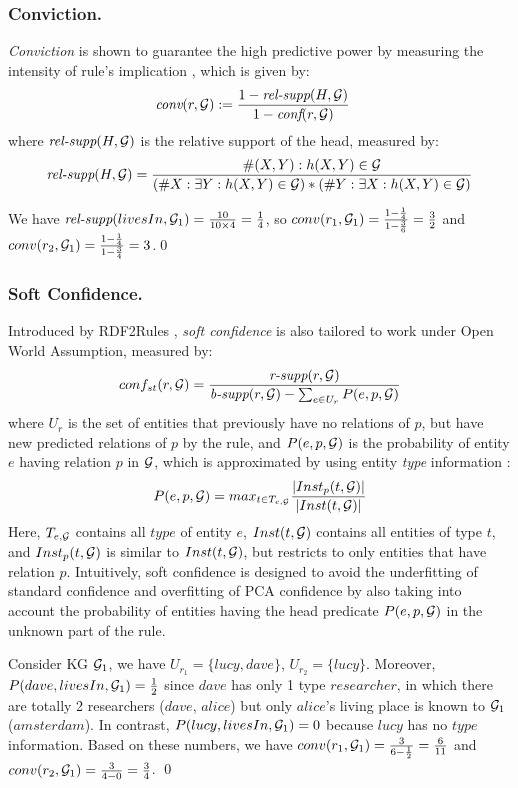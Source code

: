 \subsubsection{Conviction.} \textit{Conviction} is shown to guarantee the high predictive power \cite{Azevedo2007} by measuring the intensity of rule's implication \cite{metrics-summary}, which is given by:
\begin{align*}
\textit{conv}(r,\mathcal{G}) & := \frac{1 - \textit{rel-supp}(H, \mathcal{G})}{1-\textit{conf}(r,\mathcal{G})}
\end{align*}
where $\textit{rel-supp}(H, \mathcal{G})$ is the relative support of the head, measured by:
\begin{align*}
\textit{rel-supp}(H, \mathcal{G}) = \dfrac{\#(X,Y):h(X,Y)\in \mathcal{G}}{(\#X:\exists Y:h(X,Y)\in \mathcal{G})*(\#Y:\exists X:h(X,Y)\in \mathcal{G})}
\end{align*}
\begin{example}
We have $\textit{rel-supp}(livesIn, \mathcal{G}_1) = \frac{10}{10 \times 4} = \frac{1}{4}$, so $conv(r_1,\mathcal{G}_1) = \frac{1-\frac{1}{4}}{1-\frac{3}{6}} = \frac{3}{2}$ and $conv(r_2,\mathcal{G}_1) = \frac{1-\frac{1}{4}}{1-\frac{3}{4}} = 3$.\qed
\end{example}
\subsubsection{Soft Confidence.} Introduced by RDF2Rules \cite{rdf2rules}, \textit{soft confidence} is also tailored to work under Open World Assumption, measured by:
\[conf_{st}(r, \mathcal{G}) = \frac{\textit{r-supp}(r, \mathcal{G})}{\textit{b-supp}(r,\mathcal{G}) - \sum_{e \in U_r}P(e,p,\mathcal{G})} \]
where $U_r$ is the set of entities that previously have no relations of $p$, but have new predicted relations of $p$ by the rule, and $P(e,p,\mathcal{G})$ is the probability of entity $e$ having relation $p$ in $\mathcal{G}$, which is approximated by using entity \textit{type} information \cite{rdf2rules}:
\[P(e,p,\mathcal{G})  = max_{t \in T_{e,\mathcal{G}}}\frac{|Inst_p(t, \mathcal{G})|}{|Inst(t, \mathcal{G})|}{}\]
Here, $T_{e,\mathcal{G}}$ contains all $type$ of entity $e$, $Inst(t, \mathcal{G})$ contains all entities of type $t$, and $Inst_p(t, \mathcal{G})$ is similar to $Inst(t, \mathcal{G})$, but restricts to only entities that have relation $p$.
Intuitively, soft confidence is designed to avoid the underfitting of standard confidence and overfitting of PCA confidence by also taking into account the probability of entities having the head predicate $P(e,p, \mathcal{G})$ in the unknown part of the rule.
\begin{example}
Consider KG $\mathcal{G}_1$, we have $U_{r_1} = \{lucy, dave\}$, $U_{r_2} = \{lucy\}$. Moreover, $P(dave,livesIn,\mathcal{G}_1) = \frac{1}{2}$ since $dave$ has only 1 type $researcher$, in which there are totally 2 researchers ($dave$, $alice$) but only $alice$'s living place is known to $\mathcal{G}_1$ ($amsterdam$). In contrast, $P(lucy,livesIn,\mathcal{G}_1) = 0$ because $lucy$ has no $type$ information.
Based on these numbers, we have $conv(r_1,\mathcal{G}_1) = \frac{3}{6-\frac{1}{2}} = \frac{6}{11}$ and $conv(r_2,\mathcal{G}_1) = \frac{3}{4-0} = \frac{3}{4}$.
\qed
\end{example}
